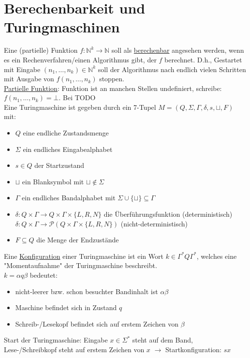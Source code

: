 \documentclass[a4paper]{article}
\newcommand{\ul}{\underline}
\let\blank\sqcup
\begin{document}
\section{Berechenbarkeit und Turingmaschinen}
Eine (partielle) Funktion $f:\mathbb{N}^k\rightarrow\mathbb{N}$ soll als \ul{berechenbar} angesehen werden, wenn es ein Rechenverfahren/einen Algorithmus gibt, der $f$ berechnet. D.h., Gestartet mit Eingabe $(n_1,\dots,n_k)\in\mathbb{N}^k$ soll der Algorithmus nach endlich vielen Schritten mit Ausgabe von $f(n_1,\dots,n_k)$ stoppen.\\
\ul{Partielle Funktion}: Funktion ist an manchen Stellen undefiniert, schreibe: $f(n_1,\dots,n_k)=\bot$. Bei TODO\\
Eine Turingmaschine ist gegeben durch ein 7-Tupel $M=(Q,\Sigma,\Gamma,\delta,s,\blank,F)$ mit:
\begin{itemize}
	\item $Q$ eine endliche Zustandsmenge
	\item $\Sigma$ ein endliches Eingabealphabet
	\item $s\in Q$ der Startzustand
	\item $\blank$ ein Blanksymbol mit $\blank\notin\Sigma$
	\item $\Gamma$ ein endliches Bandalphabet mit $\Sigma\cup\{\blank\}\subseteq\Gamma$
	\item $\delta:Q\times\Gamma\rightarrow Q\times\Gamma\times\{L,R,N\}$ die Überführungsfunktion (deterministisch)\\
	$\delta:Q\times\Gamma\rightarrow\mathcal{P}(Q\times\Gamma\times\{L,R,N\})$ (nicht-deterministisch)
	\item $F\subseteq Q$ die Menge der Endzustände
\end{itemize}
Eine \ul{Konfiguration} einer Turingmaschine ist ein Wort $k\in\Gamma^*Q\Gamma^*$, welches eine "Momentaufnahme" der Turingmaschine beschreibt.\\
$k=\alpha q\beta$ bedeutet:
\begin{itemize}
	\item nicht-leerer bzw. schon besuchter Bandinhalt ist $\alpha\beta$
	\item Maschine befindet sich in Zustand $q$
	\item Schreib-/Lesekopf befindet sich auf erstem Zeichen von $\beta$
\end{itemize}
Start der Turingmaschine: Eingabe $x\in\Sigma^*$ steht auf dem Band, Lese-/Schreibkopf steht auf erstem Zeichen von $x$ $\rightarrow$ Startkonfiguration: $sx$\\
\end{document}
